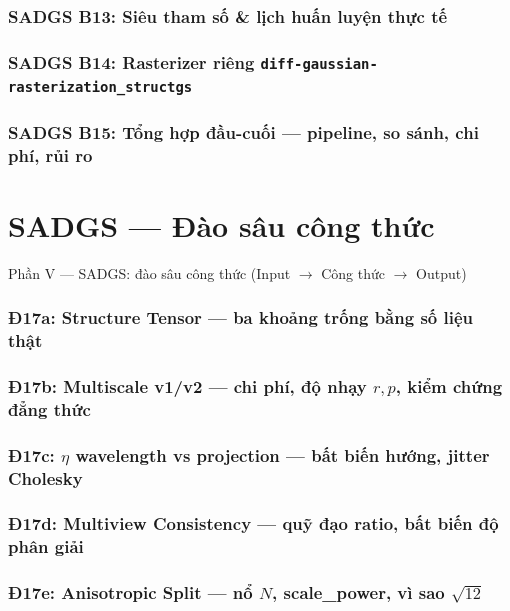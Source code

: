 \section{SADGS B13: Siêu tham số \& lịch huấn luyện thực tế}

\section{SADGS B14: Rasterizer riêng \texttt{diff-gaussian-rasterization\_structgs}}

\section{SADGS B15: Tổng hợp đầu-cuối --- pipeline, so sánh, chi phí, rủi ro}


\part{SADGS --- Đào sâu công thức}
\begin{frame}{Phần V --- SADGS: đào sâu công thức (Input $\to$ Công thức $\to$ Output)}
\small
\tableofcontents
\end{frame}

\section{Đ17a: Structure Tensor --- ba khoảng trống bằng số liệu thật}

\section{Đ17b: Multiscale v1/v2 --- chi phí, độ nhạy $r,p$, kiểm chứng đẳng thức}

\section{Đ17c: $\eta$ wavelength vs projection --- bất biến hướng, jitter Cholesky}

\section{Đ17d: Multiview Consistency --- quỹ đạo ratio, bất biến độ phân giải}

\section{Đ17e: Anisotropic Split --- nổ $N$, scale\_power, vì sao $\sqrt{12}$}

